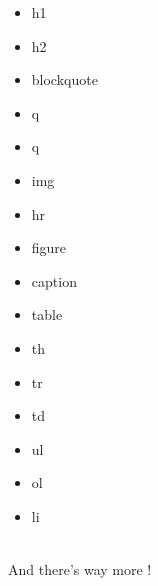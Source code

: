 \documentclass{article}
\begin{document}
\begin{minipage}[c]{0.25\textwidth}
    \begin{itemize}[label = $\bullet$]
        \item h1
        \item h2
        \item blockquote
        \item q
    \end{itemize}
\end{minipage}
\begin{minipage}[c]{0.25\textwidth}
    \begin{itemize}[label = $\bullet$]
        \item q
        \item img
        \item hr
        \item figure
    \end{itemize}
\end{minipage}
\begin{minipage}[c]{0.25\textwidth}
    \begin{itemize}[label = $\bullet$]
        \item caption
        \item table
        \item th
        \item tr
    \end{itemize}
\end{minipage}
\begin{minipage}[c]{0.25\textwidth}
    \begin{itemize}[label = $\bullet$]
        \item td
        \item ul
        \item ol
        \item li
    \end{itemize}
\end{minipage}
\vspace{0.3cm} \\
And there's way more !
\end{document}
